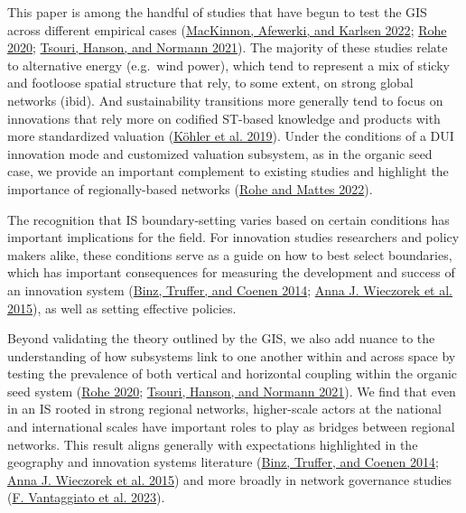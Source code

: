 \documentclass[twoside,12pt,final]{ucthesis-CA2012}
\begin{document}
\begin{ucmainmatter}
This paper is among the handful of studies that have begun to test the
GIS across different empirical cases
(\protect\hyperlink{ref-MacKinnon_Afewerki_Karlsen_2022}{MacKinnon, Afewerki, and Karlsen 2022}; \protect\hyperlink{ref-Rohe_2020}{Rohe 2020}; \protect\hyperlink{ref-Tsouri_Hanson_Normann_2021}{Tsouri, Hanson, and Normann 2021}).
The majority of these studies relate to alternative energy (e.g.~wind
power), which tend to represent a mix of sticky and footloose spatial
structure that rely, to some extent, on strong global networks (ibid).
And sustainability transitions more generally tend to focus on
innovations that rely more on codified ST-based knowledge and products
with more standardized valuation
(\protect\hyperlink{ref-Kuxf6hler_Geels_Kern_Markard_Onsongo_Wieczorek_Alkemade_Avelino_Bergek_Boons_et_al._2019}{Köhler et al. 2019}). Under the
conditions of a DUI innovation mode and customized valuation subsystem,
as in the organic seed case, we provide an important complement to
existing studies and highlight the importance of regionally-based
networks (\protect\hyperlink{ref-Rohe_Mattes_2022}{Rohe and Mattes 2022}).

The recognition that IS boundary-setting varies based on certain
conditions has important implications for the field. For innovation
studies researchers and policy makers alike, these conditions serve as a
guide on how to best select boundaries, which has important consequences
for measuring the development and success of an innovation system
(\protect\hyperlink{ref-Binz_Truffer_Coenen_2014}{Binz, Truffer, and Coenen 2014}; \protect\hyperlink{ref-Wieczorek_Hekkert_Coenen_Harmsen_2015}{Anna J. Wieczorek et al. 2015}),
as well as setting effective policies.

Beyond validating the theory outlined by the GIS, we also add nuance to
the understanding of how subsystems link to one another within and
across space by testing the prevalence of both vertical and horizontal
coupling within the organic seed system
(\protect\hyperlink{ref-Rohe_2020}{Rohe 2020}; \protect\hyperlink{ref-Tsouri_Hanson_Normann_2021}{Tsouri, Hanson, and Normann 2021}).
We find that even in an IS rooted in strong regional networks,
higher-scale actors at the national and international scales have
important roles to play as bridges between regional networks. This
result aligns generally with expectations highlighted in the geography
and innovation systems literature
(\protect\hyperlink{ref-Binz_Truffer_Coenen_2014}{Binz, Truffer, and Coenen 2014}; \protect\hyperlink{ref-Wieczorek_Hekkert_Coenen_Harmsen_2015}{Anna J. Wieczorek et al. 2015})
and more broadly in network governance studies
(\protect\hyperlink{ref-Vantaggiato_Lubell_Hummel_Chow_Tcheukam_Siwe_2023}{F. Vantaggiato et al. 2023}).


\end{ucmainmatter}
\end{document}
